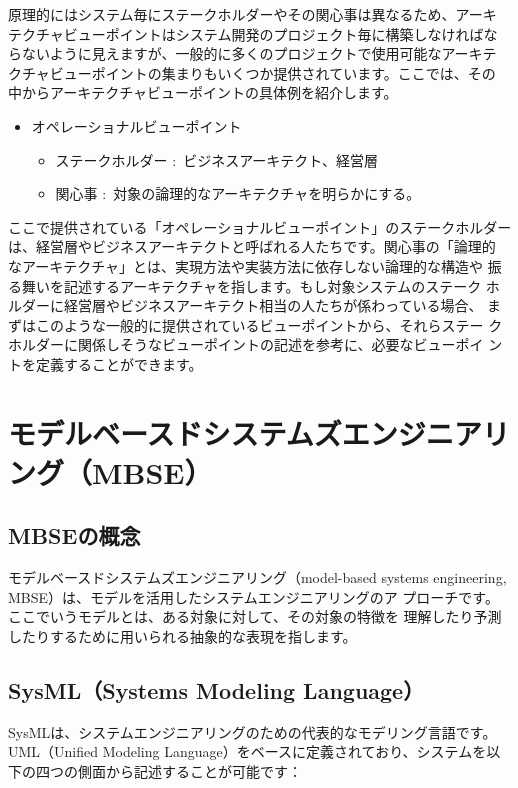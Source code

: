 原理的にはシステム毎にステークホルダーやその関心事は異なるため、アーキ
テクチャビューポイントはシステム開発のプロジェクト毎に構築しなければな
らないように見えますが、一般的に多くのプロジェクトで使用可能なアーキテ
クチャビューポイントの集まりもいくつか提供されています。ここでは、その
中からアーキテクチャビューポイントの具体例を紹介します。

\begin{itemize}
\item オペレーショナルビューポイント
  \begin{itemize}
\item ステークホルダー $\colon$ ビジネスアーキテクト、経営層
\item 関心事 $\colon$ 対象の論理的なアーキテクチャを明らかにする。
  \end{itemize}
\end{itemize}
ここで提供されている「オペレーショナルビューポイント」のステークホルダー
は、経営層やビジネスアーキテクトと呼ばれる人たちです。関心事の「論理的
  なアーキテクチャ」とは、実現方法や実装方法に依存しない論理的な構造や
振る舞いを記述するアーキテクチャを指します。もし対象システムのステーク
ホルダーに経営層やビジネスアーキテクト相当の人たちが係わっている場合、
まずはこのような一般的に提供されているビューポイントから、それらステー
クホルダーに関係しそうなビューポイントの記述を参考に、必要なビューポイ
ントを定義することができます。

\section{モデルベースドシステムズエンジニアリング（MBSE）}

\subsection{MBSEの概念}

モデルベースドシステムズエンジニアリング（model-based systems
  engineering, MBSE）は、モデルを活用したシステムエンジニアリングのア
プローチです。ここでいうモデルとは、ある対象に対して、その対象の特徴を
理解したり予測したりするために用いられる抽象的な表現を指します。

\subsection{SysML（Systems Modeling Language）}

SysMLは、システムエンジニアリングのための代表的なモデリング言語です。
UML（Unified Modeling Language）をベースに定義されており、システムを以
下の四つの側面から記述することが可能です：


